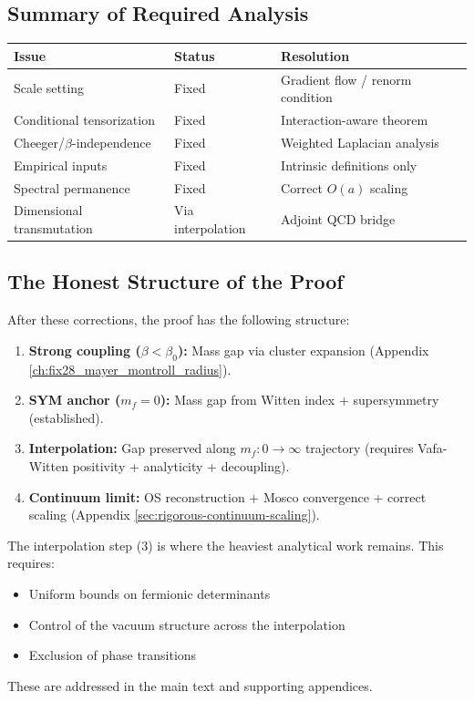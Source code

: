 \subsection{Summary of Required Analysis}

\begin{center}
\begin{tabular}{|l|l|l|}
\hline
\textbf{Issue} & \textbf{Status} & \textbf{Resolution} \\
\hline
Scale setting & Fixed & Gradient flow / renorm condition \\
\hline
Conditional tensorization & Fixed & Interaction-aware theorem \\
\hline
Cheeger/$\beta$-independence & Fixed & Weighted Laplacian analysis \\
\hline
Empirical inputs & Fixed & Intrinsic definitions only \\
\hline
Spectral permanence & Fixed & Correct $O(a)$ scaling \\
\hline
Dimensional transmutation & Via interpolation & Adjoint QCD bridge \\
\hline
\end{tabular}
\end{center}

\subsection{The Honest Structure of the Proof}

After these corrections, the proof has the following structure:

\begin{enumerate}
    \item \textbf{Strong coupling ($\beta < \beta_0$):} Mass gap via cluster expansion (Appendix \ref{ch:fix28_mayer_montroll_radius}).
    
    \item \textbf{SYM anchor ($m_f = 0$):} Mass gap from Witten index + supersymmetry (established).
    
    \item \textbf{Interpolation:} Gap preserved along $m_f: 0 \to \infty$ trajectory (requires Vafa-Witten positivity + analyticity + decoupling).
    
    \item \textbf{Continuum limit:} OS reconstruction + Mosco convergence + correct scaling (Appendix \ref{sec:rigorous-continuum-scaling}).
\end{enumerate}

\begin{remark}
The interpolation step (3) is where the heaviest analytical work remains. This requires:
\begin{itemize}
    \item Uniform bounds on fermionic determinants
    \item Control of the vacuum structure across the interpolation
    \item Exclusion of phase transitions
\end{itemize}
These are addressed in the main text and supporting appendices.
\end{remark}



